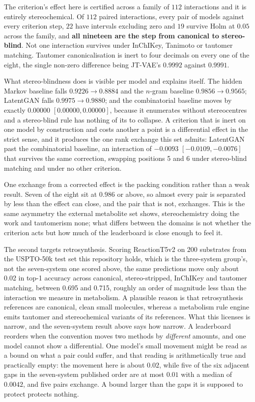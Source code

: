 The criterion's effect here is certified across a family of $112$ interactions and it is entirely stereochemical. Of $112$ paired
interactions, every pair of models against every criterion step, $22$ have intervals excluding
zero and $19$ survive Holm at $0.05$ across the family, and \textbf{all nineteen are the step from
canonical to stereo-blind}. Not one interaction survives under InChIKey, Tanimoto or tautomer
matching. Tautomer canonicalisation is inert to four decimals on every one of the eight, the single
non-zero difference being JT-VAE's $0.9992$ against $0.9991$.

What stereo-blindness does is visible per model and explains itself. The hidden Markov baseline
falls $0.9226 \to 0.8884$ and the $n$-gram baseline $0.9856 \to 0.9565$; LatentGAN falls
$0.9975 \to 0.9880$; and the combinatorial baseline moves by exactly $0.00000$
$[0.00000,0.00000]$, because it enumerates without stereocentres and a stereo-blind rule has nothing
of its to collapse. A criterion that is inert on one model by construction and costs another a
point is a differential effect in the strict sense, and it produces the one rank exchange this set
admits: LatentGAN past the combinatorial baseline, an interaction of $-0.0093$
$[-0.0109,-0.0076]$ that survives the same correction, swapping positions 5 and 6 under stereo-blind
matching and under no other criterion.

One exchange from a corrected effect is the packing condition rather than a weak result. Seven of
the eight sit at $0.986$ or above, so almost every pair is separated by less than the effect can
close, and the pair that is not, exchanges. This is the same asymmetry the external metabolite
set shows, stereochemistry doing the work and tautomerism none; what differs between the domains is
not whether the criterion acts but how much of the leaderboard is close enough to feel it.

The second targets retrosynthesis. Scoring ReactionT5v2 on 200
substrates from the USPTO-50k test set this repository holds, which is the three-system
group's, not the seven-system one scored above, the same predictions move only about 0.02 in top-1
accuracy across canonical, stereo-stripped, InChIKey and tautomer matching, between 0.695 and
0.715, roughly an order of magnitude less than the interaction we measure in metabolism. A
plausible reason is that retrosynthesis references are canonical, clean small molecules, whereas a
metabolism rule engine emits tautomer and stereochemical variants of its references. What this
licenses is narrow, and the seven-system result above says how narrow. A leaderboard reorders when
the convention moves two methods by \emph{different} amounts, and one model cannot show a
differential. One model's small movement might be read as a bound on what a pair could
suffer, and that reading is arithmetically true and practically empty: the movement here is about
$0.02$, while five of the six adjacent gaps in the seven-system published order are at most $0.01$
with a median of $0.0042$, and five pairs exchange. A
bound larger than the gaps it is supposed to protect protects nothing.

